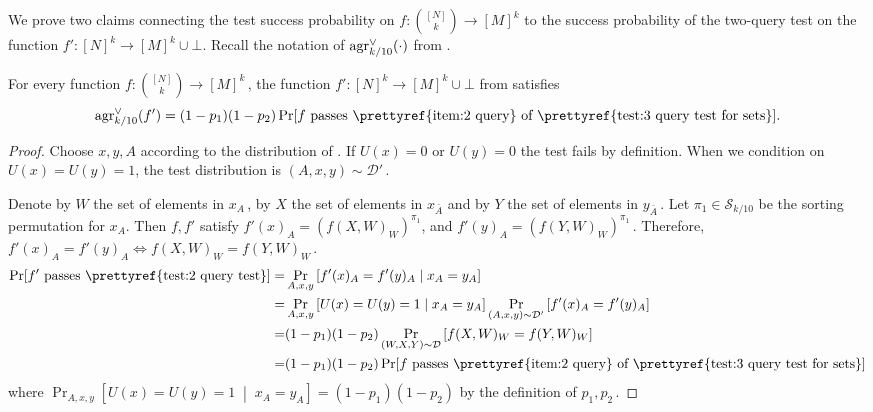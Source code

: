 \documentclass{toc}
\newcommand{\Prob}[2][]{\Pr_{{#1}}\left[#2\right]} %
\newcommand{\given}{\;\middle\vert\;} %
\newcommand\f{f} %
\newcommand\setf{f} %
\newcommand{\test}[2]{
	\ifx &#2&
	\textrm{agr}^{#1}
	\else	
	\textrm{agr}^{#1}_{#2}
	\fi}
\newcommand{\sets}{\binom{[N]}{k}} %
\newcommand\rest[1]{{\bar{#1}}}  %
\begin{document}
We prove two claims connecting the test success probability on $\setf:\sets\rightarrow[M]^k$ %
to the success probability of the %
two-query  %
test on the function $\f':[N]^k\rightarrow[M]^k\cup\bot$.  Recall the notation of  $\test{\vee}{k/10}(\cdot)$ from .
\begin{claim} \label{claim:set to tuples func}
	For every function $\setf:\sets\rightarrow[M]^k$\,, the function $\f':[N]^k\rightarrow[M]^k\cup\bot$ from  satisfies
%
%
%
	\[ \test{\vee}{k/10}(\f') = (1-p_1)(1-p_2)\Pr[\setf \text{ passes
 \prettyref{item:2 query}  of \prettyref{test:3 query test for sets}}].\]

\end{claim}
\begin{proof}
	Choose $x,y,A$ according to the distribution of .
	If $U(x)=0$ or $U(y)=0$ the test fails by definition. When we condition on $U(x)=U(y)=1$, the test distribution is $(A,x,y)\sim\mathcal{D}'$\,. 
	
	Denote by $W$ the set of elements in $x_A$\,, by $X$ the set of elements in $x_\rest{A}$ and by $Y$ the set of elements in $y_\rest{A}$\,. Let $\pi_1\in \mathcal{S}_{k/10}$ be the sorting permutation for $x_A$. Then $\f,\f'$ satisfy $\f'(x)_A = (\setf(X,W)_W)^{\pi_1}$, and $\f'(y)_A = (\setf(Y,W)_W)^{\pi_1}$\,. Therefore, $\f'(x)_A=\f'(y)_A\iff \setf(X,W)_W=\setf(Y,W)_W$\,.
	\begin{align*}
\Pr[\f' \text{ passes \prettyref{test:2 query test}}] %
=& \Prob[A,x,y]{\f'(x)_A = \f'(y)_A \given x_A=y_A} \\
	=&\Prob[A,x,y]{U(x)=U(y)=1 \given x_A=y_A}\Prob[(A,x,y)\sim\mathcal{D'}]{\f'(x)_A=\f'(y)_A} \\
	=&(1-p_1)(1-p_2)\Prob[(W,X,Y)\sim\mathcal{D}]{\setf(X,W)_W=\setf(Y,W)_W} \\
	=&(1-p_1)(1-p_2)\Pr[\setf \text{ passes  \prettyref{item:2 query}  of \prettyref{test:3 query test for sets}}]%
\end{align*}
%
where  %
$\Prob[A,x,y]{U(x)=U(y)=1 \given x_A=y_A}=(1-p_1)(1-p_2)$ by the definition of $p_1,p_2$\,.
%
\end{proof}
\end{document}
